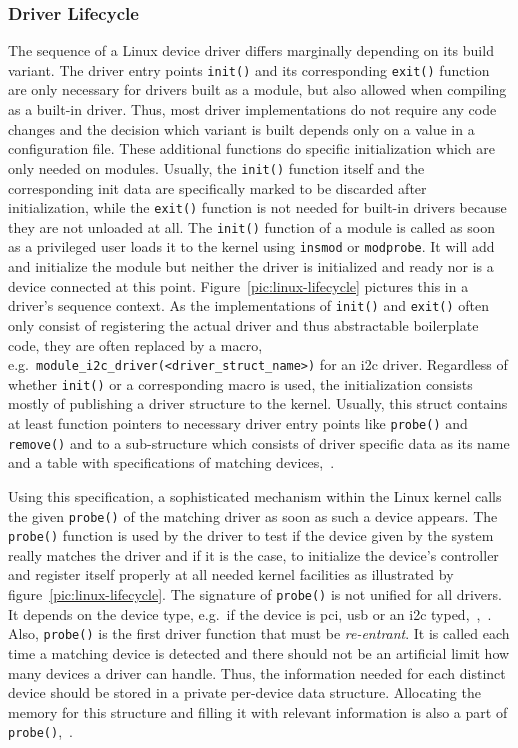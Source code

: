 \subsubsection*{Driver Lifecycle}
The sequence of a Linux device driver differs marginally depending on its build variant.
The driver entry points \texttt{init()} and its corresponding \texttt{exit()} function are only necessary for drivers built as a module, but also allowed when compiling as a built-in driver.
Thus, most driver implementations do not require any code changes and the decision which variant is built depends only on a value in a configuration file.
These additional functions do specific initialization which are only needed on modules.
Usually, the \texttt{init()} function itself and the corresponding init data are specifically marked to be discarded after initialization, while the \texttt{exit()} function is not needed for built-in drivers because they are not unloaded at all\cite{lfd430}.
The \texttt{init()} function of a module is called as soon as a privileged user loads it to the kernel using \texttt{insmod} or \texttt{modprobe}.
It will add and initialize the module but neither the driver is initialized and ready nor is a device connected at this point.
Figure~\ref{pic:linux-lifecycle} pictures this in a driver's sequence context.
As the implementations of \texttt{init()} and \texttt{exit()} often only consist of registering the actual driver and thus abstractable boilerplate code, they are often replaced by a macro, e.g.\ \texttt{module\_i2c\_driver(<driver\_struct\_name>)} for an \ac{i2c} driver.
Regardless of whether \texttt{init()} or a corresponding macro is used, the initialization consists mostly of publishing a driver structure to the kernel.
Usually, this struct contains at least function pointers to necessary driver entry points like \texttt{probe()} and \texttt{remove()} and to a sub-structure which consists of driver specific data as its name and a table with specifications of matching devices\cite{quade2016Linux},~\cite{lfd430}. 

Using this specification, a sophisticated mechanism within the Linux kernel calls the given \texttt{probe()} of the matching driver as soon as such a device appears.
The \texttt{probe()} function is used by the driver to test if the device given by the system really matches the driver and if it is the case, to initialize the device's controller and register itself properly at all needed kernel facilities as illustrated by figure~\ref{pic:linux-lifecycle}.
The signature of \texttt{probe()} is not unified for all drivers.
It depends on the device type, e.g.\ if the device is \ac{pci}, \ac{usb} or an \ac{i2c} typed\cite{lfd430},~\cite{quade2016Linux},~\cite{corbet2005linux}.
Also, \texttt{probe()} is the first driver function that must be \textit{re-entrant}.
It is called each time a matching device is detected and there should not be an artificial limit how many devices a driver can handle. 
Thus, the information needed for each distinct device should be stored in a private per-device data structure.
Allocating the memory for this structure and filling it with relevant information is also a part of \texttt{probe()}\cite{lfd430},~\cite{quade2016Linux}.

